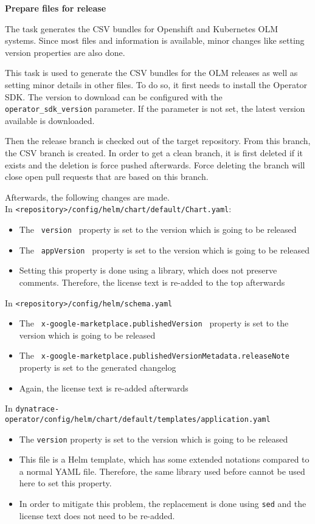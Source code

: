 \textbf{Prepare files for release}

The task generates the CSV bundles for Openshift and Kubernetes OLM systems.
Since most files and information is available, minor changes like setting version properties are also done.

This task is used to generate the CSV bundles for the OLM releases as well as setting minor details in other files.
To do so, it first needs to install the Operator SDK.
The version to download can be configured with the \verb|operator_sdk_version| parameter.
If the parameter is not set, the latest version available is downloaded.

Then the release branch is checked out of the target repository.
From this branch, the CSV branch is created.
In order to get a clean branch, it is first deleted if it exists and the deletion is force pushed afterwards.
Force deleting the branch will close open pull requests that are based on this branch.

Afterwards, the following changes are made. \\
In \verb|<repository>/config/helm/chart/default/Chart.yaml|:
\begin{itemize}
    \item The \verb| version | property is set to the version which is going to be released
    \item The \verb| appVersion | property is set to the version which is going to be released
    \item Setting this property is done using a library, which does not preserve comments.
    Therefore, the license text is re-added to the top afterwards
\end{itemize}

In \verb|<repository>/config/helm/schema.yaml|
\begin{itemize}
    \item The \verb| x-google-marketplace.publishedVersion | property is set to the version which is going to be released
    \item The \verb| x-google-marketplace.publishedVersionMetadata.releaseNote | property is set to the generated changelog
    \item Again, the license text is re-added afterwards
\end{itemize}

In \verb|dynatrace-operator/config/helm/chart/default/templates/application.yaml|
\begin{itemize}
    \item The \verb|version| property is set to the version which is going to be released
    \item This file is a Helm template, which has some extended notations compared to a normal YAML file.
        Therefore, the same library used before cannot be used here to set this property.
    \item In order to mitigate this problem, the replacement is done using \verb|sed| and the license text does not need to be re-added.
\end{itemize}

